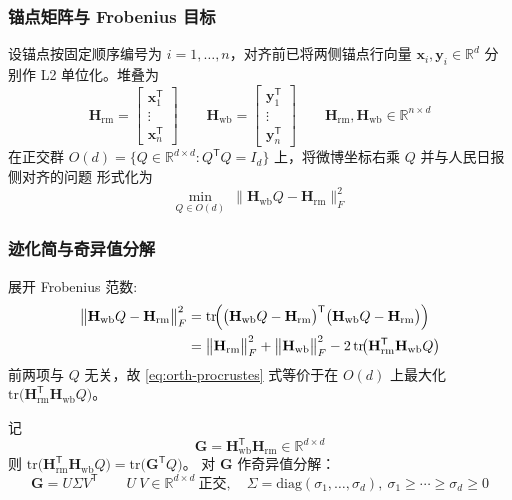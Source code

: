 \documentclass[withoutpreface]{cumcmthesis}
\begin{document}
\subsubsection{锚点矩阵与 Frobenius 目标}
设锚点按固定顺序编号为 $i=1,\ldots,n$，对齐前已将两侧锚点行向量 $\mathbf{x}_i,\mathbf{y}_i\in\mathbb{R}^{d}$ 分别作 L2 单位化。堆叠为
\begin{equation}
  \mathbf{H}_{\mathrm{rm}}=
  \begin{bmatrix}\mathbf{x}_1^{\mathsf{T}}\\ \vdots\\ \mathbf{x}_n^{\mathsf{T}}\end{bmatrix}
  \qquad
  \mathbf{H}_{\mathrm{wb}}=
  \begin{bmatrix}\mathbf{y}_1^{\mathsf{T}}\\ \vdots\\ \mathbf{y}_n^{\mathsf{T}}\end{bmatrix}
  \qquad
  \mathbf{H}_{\mathrm{rm}},\mathbf{H}_{\mathrm{wb}}\in\mathbb{R}^{n\times d}
\end{equation}
在正交群 $O(d)=\{Q\in\mathbb{R}^{d\times d}:Q^{\mathsf{T}}Q=I_d\}$ 上，将微博坐标右乘 $Q$ 并与人民日报侧对齐的问题
形式化为
\begin{equation}
  \min_{Q\in O(d)}\ \bigl\lVert \mathbf{H}_{\mathrm{wb}}Q-\mathbf{H}_{\mathrm{rm}}\bigr\rVert_F^2 
  \label{eq:orth-procrustes}
\end{equation}

\subsubsection{迹化简与奇异值分解}
展开 Frobenius 范数:
\begin{align}
  \bigl\lVert \mathbf{H}_{\mathrm{wb}}Q-\mathbf{H}_{\mathrm{rm}}\bigr\rVert_F^2
  &= \mathrm{tr}\!\Bigl(\bigl(\mathbf{H}_{\mathrm{wb}}Q-\mathbf{H}_{\mathrm{rm}}\bigr)^{\mathsf{T}}
     \bigl(\mathbf{H}_{\mathrm{wb}}Q-\mathbf{H}_{\mathrm{rm}}\bigr)\Bigr) \notag\\
  &= \bigl\lVert \mathbf{H}_{\mathrm{rm}}\bigr\rVert_F^2+\bigl\lVert \mathbf{H}_{\mathrm{wb}}\bigr\rVert_F^2
     -2\,\mathrm{tr}\!\bigl(\mathbf{H}_{\mathrm{rm}}^{\mathsf{T}}\mathbf{H}_{\mathrm{wb}}Q\bigr) 
\end{align}
前两项与 $Q$ 无关，故 \eqref{eq:orth-procrustes} 式等价于在 $O(d)$ 上最大化 $\mathrm{tr}\!\bigl(\mathbf{H}_{\mathrm{rm}}^{\mathsf{T}}\mathbf{H}_{\mathrm{wb}}Q\bigr)$。

记
\begin{equation}
  \mathbf{G}=\mathbf{H}_{\mathrm{wb}}^{\mathsf{T}}\mathbf{H}_{\mathrm{rm}}\in\mathbb{R}^{d\times d}
\end{equation}
则 $\mathrm{tr}\!\bigl(\mathbf{H}_{\mathrm{rm}}^{\mathsf{T}}\mathbf{H}_{\mathrm{wb}}Q\bigr)=\mathrm{tr}\!\bigl(\mathbf{G}^{\mathsf{T}}Q\bigr)$。
对 $\mathbf{G}$ 作奇异值分解：
\begin{equation}
  \mathbf{G}=U\Sigma V^{\mathsf{T}}\qquad
  U \ V\in\mathbb{R}^{d\times d}\ \text{正交},\quad
  \Sigma=\mathrm{diag}(\sigma_1,\ldots,\sigma_d),\ \sigma_1\ge\cdots\ge\sigma_d\ge 0 
\end{equation}
\end{document}
